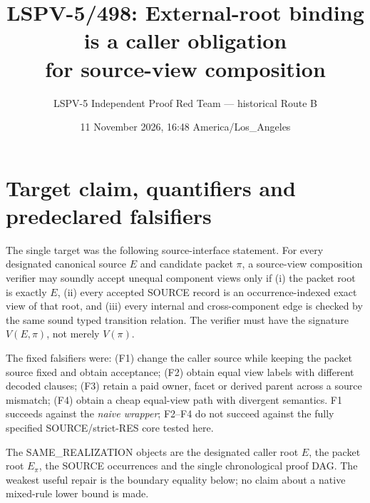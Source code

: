 \documentclass[11pt]{article}
\title{LSPV-5/498: External-root binding is a caller obligation\\for source-view composition}
\author{LSPV-5 Independent Proof Red Team --- historical Route B}
\date{11 November 2026, 16:48 America/Los\_Angeles}
\begin{document}
\maketitle

\begin{center}
\end{center}

\section{Target claim, quantifiers and predeclared falsifiers}
The single target was the following source-interface statement.
For every designated canonical source $E$ and candidate packet $\pi$, a
source-view composition verifier may soundly accept unequal component views
only if (i) the packet root is exactly $E$, (ii) every accepted SOURCE record
is an occurrence-indexed exact view of that root, and (iii) every internal and
cross-component edge is checked by the same sound typed transition relation.
The verifier must have the signature $V(E,\pi)$, not merely $V(\pi)$.

The fixed falsifiers were: (F1) change the caller source while keeping the
packet source fixed and obtain acceptance; (F2) obtain equal view labels with
different decoded clauses; (F3) retain a paid owner, facet or derived parent
across a source mismatch; (F4) obtain a cheap equal-view path with divergent
semantics.  F1 succeeds against the \emph{naive wrapper}; F2--F4 do not
succeed against the fully specified SOURCE/strict-RES core tested here.

The SAME\_REALIZATION objects are the designated caller root $E$, the packet
root $E_\pi$, the SOURCE occurrences and the single chronological proof DAG.
The weakest useful repair is the boundary equality below; no claim about a
native mixed-rule lower bound is made.
\end{document}

